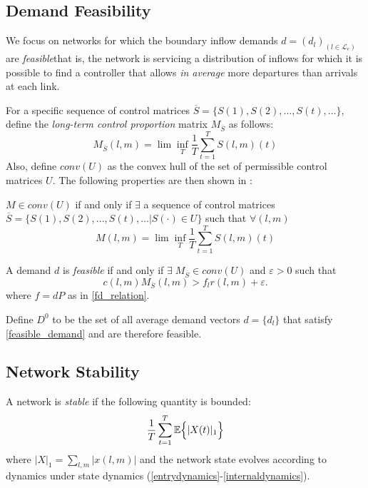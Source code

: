 \subsection*{Demand Feasibility}
We focus on networks for which the boundary inflow demands $d = (d_{l})_{(l\in \mathcal{L}_{e})}$ are \emph{feasible}\textemdash that is, the network is servicing a distribution of inflows for which it is possible to find a controller that allows \textit{in average} more departures than arrivals at each link. 

For a specific sequence of control matrices $\overline{S} = \{S(1),S(2),...,S(t),...\}$, define the \emph{long-term control proportion} matrix $M_{\overline S}$ as follows: 
\begin{equation}
M_{\overline{S}}(l,m) = \lim\inf_{T}\dfrac{1}{T}\sum_{t=1}^{T} S(l,m)(t)
\end{equation}
Also, define $conv(U)$ as the convex hull of the set of permissible control matrices $U$. The following properties are then shown in \cite{MaxPressureStochastic}: 
\begin{Prop}
$M \in conv(U)$ if and only if $\exists$ a sequence of control matrices $\overline S = \{S(1),S(2),...,S(t),... \vert S(\cdot) \in U\}$ such that $\forall (l,m)$
\begin{equation}
M(l,m) = \lim\inf_{T}\dfrac{1}{T}\sum_{t=1}^{T}S(l,m)(t)
\end{equation}
\end{Prop}
\begin{Prop}
A demand $d$ is \emph{feasible} if and only if  $\exists \; M_{\overline S} \in conv(U)$ and $ \varepsilon > 0$ such that
 \begin{equation}  \label{feasible_demand} 
 c(l,m)M_{\overline S}(l,m) > f_{l}r(l,m) + \varepsilon. 
 \end{equation}
 where $f = dP$ as in \eqref{fd_relation}. 
\end{Prop}

Define $D^0$ to be the set of all average demand vectors $d=\{d_l\}$ that satisfy \eqref{feasible_demand} and are therefore feasible.

\subsection*{Network Stability}
A network is \emph{stable} if the following quantity is bounded:
\begin{equation} \label{stability_condition}
 \dfrac{1}{T}\sum_{t=1}^{T}\expectation{\vert X(t) \vert_{1}}
 \end{equation}
where $\vert X\vert_{1} = \sum_{l,m} \vert x(l,m)\vert$ and the network state evolves according to dynamics under state dynamics (\ref{entrydynamics}-\ref{internaldynamics}).


